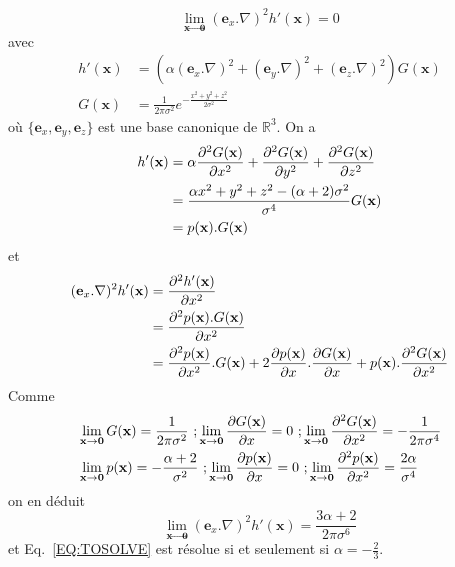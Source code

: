 \begin{equation}
    \lim_{\textbf{x}\to \textbf{0}} (\textbf{e}_x.\nabla)^2 h'(\textbf{x})=0
    \label{EQ:TOSOLVE}
\end{equation}
avec 
\begin{align}
h'(\textbf{x}) & = (\alpha(\textbf{e}_x.\nabla)^2 + (\textbf{e}_y.\nabla)^2 + (\textbf{e}_z.\nabla)^2)G(\textbf{x}) \nonumber \\
G(\textbf{x})& = \frac{1}{2 \pi \sigma^2}e^{-\frac{x^2 + y^2 + z^2}{2\sigma^2}} \nonumber
\end{align}
où $\{\textbf{e}_x, \textbf{e}_y, \textbf{e}_z\}$ est une base canonique de  $\mathbb  R^3$.
On a
\begin{align}
h'(\textbf{x}) & =   \alpha  \frac{\partial ^{2}G(\textbf{x})}{\partial x^2} + \frac{\partial ^{2}G(\textbf{x})}{\partial y^2} + \frac{\partial ^{2}G(\textbf{x})}{\partial z^2} \nonumber \\ 
& = \frac{\alpha x^2 + y^2 + z^2 - (\alpha+2) \sigma^2}{\sigma^4} G(\textbf{x}) \\
& = p(\textbf{x}).G(\textbf{x})
\nonumber
\end{align}
et
\begin{align}
    (\textbf{e}_x.\nabla)^2 h'(\textbf{x}) &= \frac{\partial ^{2}h'(\textbf{x})}{\partial x^2} \\
    & = \frac{\partial ^{2}p(\textbf{x}).G(\textbf{x})}{\partial x^2} \nonumber\\
    & = \frac{\partial ^{2}p(\textbf{x})}{\partial x^2} .G(\textbf{x}) + 2 \frac{\partial p(\textbf{x})}{\partial x} . \frac{\partial G(\textbf{x})}{\partial x} + p(\textbf{x}). \frac{\partial ^{2}G(\textbf{x})}{\partial x^2} \nonumber
\end{align}
Comme
\begin{align}
    &\lim_{\textbf{x}\to \textbf{0}} G(\textbf{x}) = \frac{1}{2 \pi \sigma^2}~; 
    \lim_{\textbf{x}\to \textbf{0}} \frac{\partial G(\textbf{x})}{\partial x}  = 0~; 
    \lim_{\textbf{x}\to \textbf{0}} \frac{\partial ^{2}G(\textbf{x})}{\partial x^{2}}  = -\frac{1}{2 \pi \sigma^4} \nonumber\\
    &\lim_{\textbf{x}\to \textbf{0}} p(\textbf{x}) = - \frac{\alpha + 2}{\sigma^2}~; 
    \lim_{\textbf{x}\to \textbf{0}} \frac{\partial p(\textbf{x})}{\partial x}  = 0~; 
    \lim_{\textbf{x}\to \textbf{0}} \frac{\partial ^{2}p(\textbf{x})}{\partial x^{2}} = \frac{2 \alpha}{\sigma^4} \nonumber
\end{align}
on en déduit
\begin{equation}
\lim_{\textbf{x}\to \textbf{0}} (\textbf{e}_x.\nabla)^2 h'(\textbf{x}) = 
\frac{3\alpha + 2}{2 \pi \sigma^6} \nonumber
\end{equation}
et Eq.~\eqref{EQ:TOSOLVE} est résolue si et seulement si $\alpha = -\frac{2}{3}$.